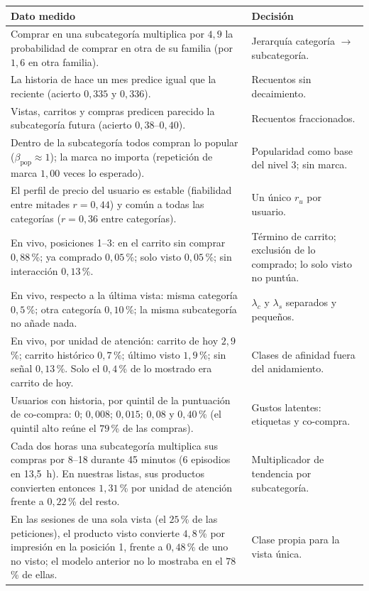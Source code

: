\documentclass[11pt,a4paper]{article}
\begin{document}
\begin{center}
\begin{tabular}{p{7.4cm}p{7.4cm}}
\toprule
Dato medido & Decisión\\
\midrule
Comprar en una subcategoría multiplica por $4{,}9$ la probabilidad de comprar en otra de su familia
(por $1{,}6$ en otra familia). & Jerarquía categoría $\to$ subcategoría.\\
La historia de hace un mes predice igual que la reciente (acierto $0{,}335$ y $0{,}336$). & Recuentos sin
decaimiento.\\
Vistas, carritos y compras predicen parecido la subcategoría futura (acierto $0{,}38$--$0{,}40$). & Recuentos
fraccionados.\\
Dentro de la subcategoría todos compran lo popular ($\beta_{\text{pop}}\approx 1$); la marca no importa
(repetición de marca $1{,}00$ veces lo esperado). & Popularidad como base del nivel 3; sin marca.\\
El perfil de precio del usuario es estable (fiabilidad entre mitades $r=0{,}44$) y común a todas las
categorías ($r=0{,}36$ entre categorías). & Un único $r_u$ por usuario.\\
En vivo, posiciones 1--3: en el carrito sin comprar $0{,}88$\,\%; ya comprado $0{,}05$\,\%; solo visto
$0{,}05$\,\%; sin interacción $0{,}13$\,\%. & Término de carrito; exclusión de lo comprado; lo solo visto no
puntúa.\\
En vivo, respecto a la última vista: misma categoría $0{,}5$\,\%; otra categoría $0{,}10$\,\%; la misma
subcategoría no añade nada. & $\lambda_c$ y $\lambda_s$ separados y pequeños.\\
En vivo, por unidad de atención: carrito de hoy $2{,}9$\,\%; carrito histórico $0{,}7$\,\%; último visto
$1{,}9$\,\%; sin señal $0{,}13$\,\%. Solo el $0{,}4$\,\% de lo mostrado era carrito de hoy. & Clases de
afinidad fuera del anidamiento.\\
Usuarios con historia, por quintil de la puntuación de co-compra: $0$; $0{,}008$; $0{,}015$; $0{,}08$ y
$0{,}40$\,\% (el quintil alto reúne el $79$\,\% de las compras). & Gustos latentes: etiquetas y co-compra.\\
Cada dos horas una subcategoría multiplica sus compras por 8--18 durante 45 minutos (6 episodios en 13{,}5~h).
En nuestras listas, sus productos convierten entonces $1{,}31$\,\% por unidad de atención frente a
$0{,}22$\,\% del resto. & Multiplicador de tendencia por subcategoría.\\
En las sesiones de una sola vista (el $25$\,\% de las peticiones), el producto visto convierte $4{,}8$\,\% por
impresión en la posición 1, frente a $0{,}48$\,\% de uno no visto; el modelo anterior no lo mostraba en el
$78$\,\% de ellas. & Clase propia para la vista única.\\
\bottomrule
\end{tabular}
\end{center}
\end{document}
